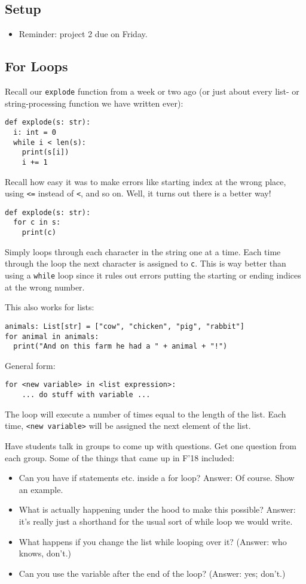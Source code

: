 \documentclass{article}
\begin{document}
\subsection*{Setup}
\begin{itemize}
\item Reminder: project 2 due on Friday.
\end{itemize}

\subsection*{For Loops}

Recall our \verb|explode| function from a week or two ago (or just
about every list- or string-processing function we have written ever):
\begin{verbatim}
def explode(s: str):
  i: int = 0
  while i < len(s):
    print(s[i])
    i += 1
\end{verbatim}
Recall how easy it was to make errors like starting index at the wrong
place, using \verb|<=| instead of \verb|<|, and so on.  Well, it turns
out there is a better way!
\begin{verbatim}
def explode(s: str):
  for c in s:
    print(c)
\end{verbatim}
Simply loops through each character in the string one at a time.  Each
time through the loop the next character is assigned to \verb|c|.
This is way better than using a \verb|while| loop since it rules out
errors putting the starting or ending indices at the wrong number.

This also works for lists:
\begin{verbatim}
animals: List[str] = ["cow", "chicken", "pig", "rabbit"]
for animal in animals:
  print("And on this farm he had a " + animal + "!")
\end{verbatim}

General form:
\begin{verbatim}
for <new variable> in <list expression>:
    ... do stuff with variable ...
\end{verbatim}

The loop will execute a number of times equal to the length of the
list.  Each time, \verb|<new variable>| will be assigned the next
element of the list.

Have students talk in groups to come up with questions.  Get one
question from each group.  Some of the things that came up in F'18
included:

\begin{itemize}
\item Can you have if statements etc. inside a for loop?  Answer: Of
  course.  Show an example.
\item What is actually happening under the hood to make this possible?
  Answer: it's really just a shorthand for the usual sort of while
  loop we would write.
\item What happens if you change the list while looping over it?
  (Answer: who knows, don't.)
\item Can you use the variable after the end of the loop? (Answer:
  yes; don't.)
\end{itemize}
\end{document}
